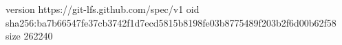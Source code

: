 version https://git-lfs.github.com/spec/v1
oid sha256:ba7b66547fe37cb3742f1d7ecd5815b8198fe03b8775489f203b2f6d00b62f58
size 262240
